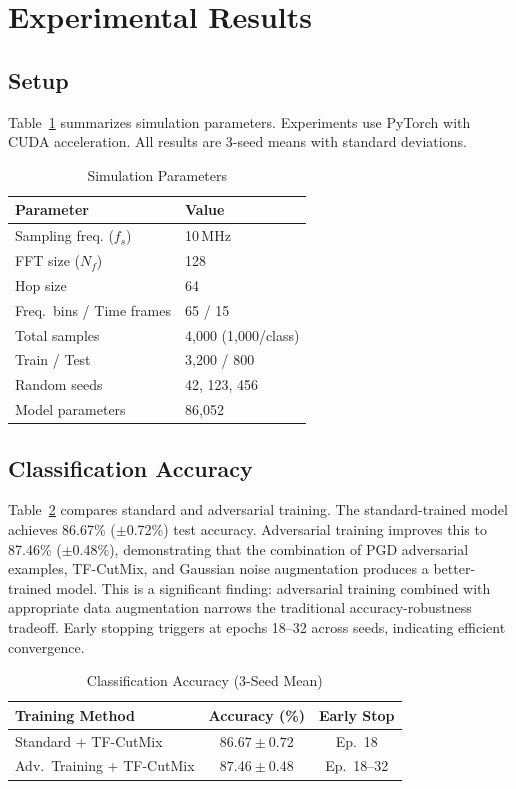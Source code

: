 \documentclass[conference]{IEEEtran}
\begin{document}
\section{Experimental Results}
\label{sec:results}

\subsection{Setup}

Table~\ref{tab:params} summarizes simulation parameters. Experiments use PyTorch with CUDA acceleration. All results are 3-seed means with standard deviations.

\begin{table}[t]
\centering
\caption{Simulation Parameters}\label{tab:params}
\begin{tabular}{ll}
\toprule
\textbf{Parameter} & \textbf{Value} \\
\midrule
Sampling freq. ($f_s$) & 10\,MHz \\
FFT size ($N_f$) & 128 \\
Hop size & 64 \\
Freq.\ bins / Time frames & 65 / 15 \\
Total samples & 4,000 (1,000/class) \\
Train / Test & 3,200 / 800 \\
Random seeds & 42, 123, 456 \\
Model parameters & 86,052 \\
\bottomrule
\end{tabular}
\end{table}

\subsection{Classification Accuracy}

Table~\ref{tab:accuracy} compares standard and adversarial training. The standard-trained model achieves 86.67\% ($\pm$0.72\%) test accuracy. Adversarial training improves this to 87.46\% ($\pm$0.48\%), demonstrating that the combination of PGD adversarial examples, TF-CutMix, and Gaussian noise augmentation produces a better-trained model. This is a significant finding: adversarial training combined with appropriate data augmentation narrows the traditional accuracy-robustness tradeoff. Early stopping triggers at epochs 18--32 across seeds, indicating efficient convergence.

\begin{table}[t]
\centering
\caption{Classification Accuracy (3-Seed Mean)}\label{tab:accuracy}
\begin{tabular}{lcc}
\toprule
\textbf{Training Method} & \textbf{Accuracy (\%)} & \textbf{Early Stop} \\
\midrule
Standard + TF-CutMix & $86.67 \pm 0.72$ & Ep.\ 18 \\
Adv.\ Training + TF-CutMix & $87.46 \pm 0.48$ & Ep.\ 18--32 \\
\bottomrule
\end{tabular}
\end{table}
\end{document}
